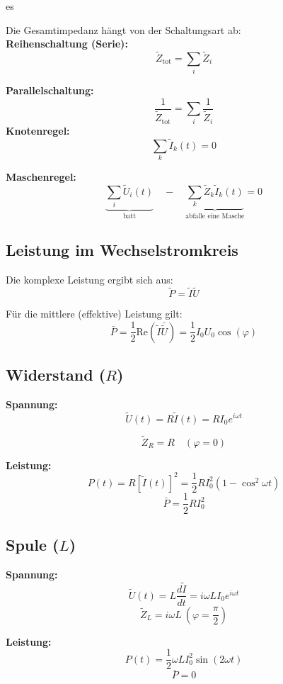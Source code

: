 es\documentclass[a4paper, fontsize=8pt, landscape]{scrartcl}
\begin{document}
\begin{multicols*}{4}
Die Gesamtimpedanz hängt von der Schaltungsart ab:\\

\textbf{Reihenschaltung (Serie):}
\[
\tilde{Z}_{\text{tot}} = \sum_i \tilde{Z}_i
\]

\textbf{Parallelschaltung:}
\[
\frac{1}{\tilde{Z}_{\text{tot}}} = \sum_i \frac{1}{\tilde{Z}_i}
\]
\textbf{Knotenregel:} 
\[
\sum_k \tilde{I}_k(t) = 0
\]

\textbf{Maschenregel:} 
\[
\underbrace{\sum_i \tilde{U}_i(t)}_{\text{batt}} 
\quad - \quad 
\underbrace{\sum_k \tilde{Z}_k \tilde{I}_k(t)}_{\text{abfalle eine Masche}} 
= 0
\]
\subsection{Leistung im Wechselstromkreis}

Die komplexe Leistung ergibt sich aus:
\[
\tilde{P} = \tilde{I} \tilde{U}
\]

Für die mittlere (effektive) Leistung gilt:
\[
\bar{P} = \frac{1}{2} \text{Re}(\tilde{I} \bar{\tilde{U}}) = \frac{1}{2} I_0 U_0 \cos(\varphi)
\]
\subsection{ Widerstand ($R$)}

\textbf{Spannung:}
\[
\tilde{U}(t) = R \tilde{I}(t) = R I_0 e^{i\omega t}
\]

\[
\tilde{Z}_R = R  \quad (\varphi = 0)
\]

\textbf{Leistung:}
\[
P(t) = R [\tilde{I}(t)]^2 = \frac{1}{2} R I_0^2 (1 - \cos^2 \omega t)
\]
\[
\bar{P} = \frac{1}{2} R I_0^2
\]
\subsection{ Spule ($L$)}

\textbf{Spannung:}
\[
\tilde{U}(t) = L \frac{d\tilde{I}}{dt} = i \omega L I_0 e^{i\omega t}
\]
\[
\tilde{Z}_L = i\omega L \ (\varphi = \frac{\pi}{2})
\]

\textbf{Leistung:}
\[
P(t) = \frac{1}{2} \omega L I_0^2 \sin(2\omega t)
\]
\[
\bar{P} = 0
\]

\end{multicols*}
\end{document}
